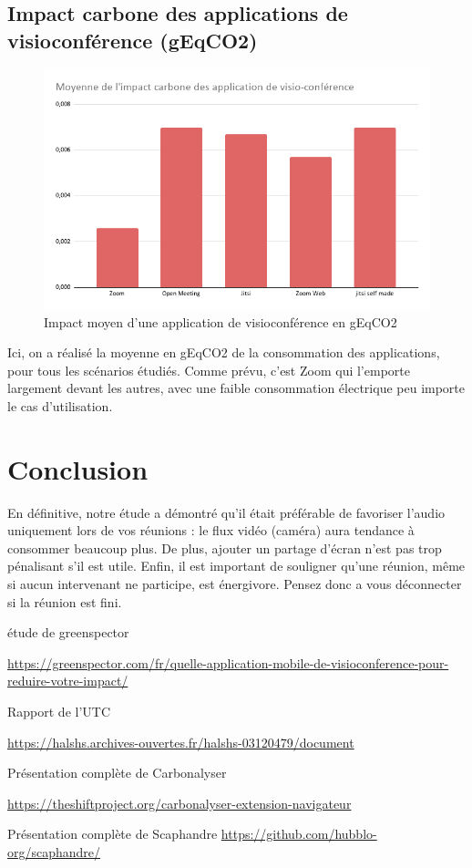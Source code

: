 \documentclass[11pt,a4paper]{report}
\begin{document}
\newpage

\section{Impact carbone des applications de visioconférence (gEqCO2)}


\begin{figure}[!h]
    \centering
    \includegraphics[scale=0.5]{moyenne.png}
    \caption{Impact moyen d'une application de visioconférence en gEqCO2}
    \label{fig:my_label}
\end{figure}

Ici, on a réalisé la moyenne en gEqCO2 de la consommation des applications, pour tous les scénarios étudiés. Comme prévu, c'est Zoom qui l'emporte largement devant les autres, avec une faible consommation électrique peu importe le cas d'utilisation.

\chapter*{Conclusion}

En définitive, notre étude a démontré qu'il était préférable de favoriser l’audio uniquement lors de vos réunions : le flux vidéo (caméra) aura tendance à consommer beaucoup plus. De plus, ajouter un partage d’écran n’est pas trop pénalisant s’il est utile. Enfin, il est important de souligner qu'une réunion, même si aucun intervenant ne participe, est énergivore. Pensez donc a vous déconnecter si la réunion est fini.


\begin{thebibliography}{9}
étude de greenspector 

\url{https://greenspector.com/fr/quelle-application-mobile-de-visioconference-pour-reduire-votre-impact/}

Rapport de l'UTC

\url{https://halshs.archives-ouvertes.fr/halshs-03120479/document}

Présentation complète de Carbonalyser

\url{https://theshiftproject.org/carbonalyser-extension-navigateur}

Présentation complète de Scaphandre
\url{https://github.com/hubblo-org/scaphandre/}

\end{thebibliography}
\end{document}
